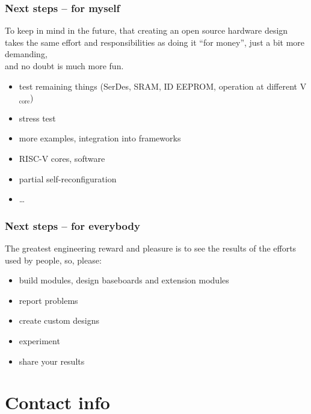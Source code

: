 \begin{frame}
  \frametitle{Next steps -- for myself}

  To keep in mind in the future, that creating an open source hardware
  design takes the same effort and responsibilities as doing it ``for
  money'', just a bit more demanding,\\and no doubt is much more fun.

  \vspace{.5cm}

  \begin{itemize}
  \item test remaining things (SerDes, SRAM, ID EEPROM,
  operation at different V$_{\text{core}}$)
  \item stress test
  \item more examples, integration into frameworks
  \item RISC-V cores, software
  \item partial self-reconfiguration
  \item \dots
  \end{itemize}
\end{frame}

\begin{frame}
  \frametitle{Next steps -- for everybody}

  The greatest engineering reward and pleasure is to see the results
  of the efforts used by people, so, please:

  \vspace{.5cm}

  \begin{itemize}
  \item build modules, design baseboards and extension modules
  \item report problems
  \item create custom designs
  \item experiment
  \item share your results
  \end{itemize}

  \vspace{-3.5cm}
  \begin{flushright}
    
  \end{flushright}

\end{frame}

\section{Contact info}




